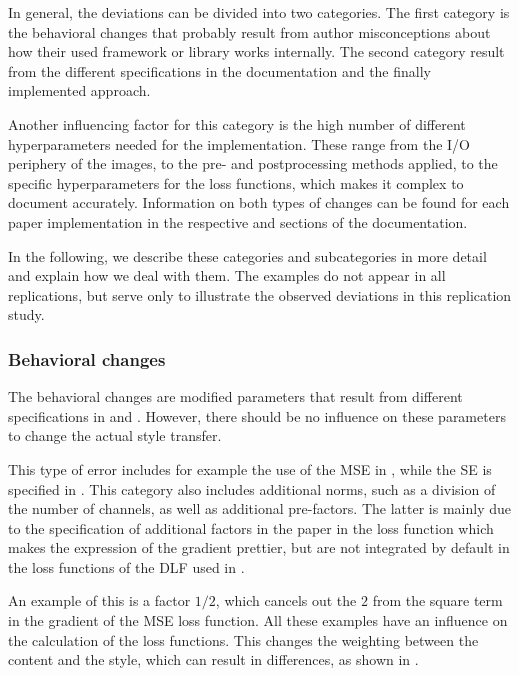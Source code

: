 In general, the deviations can be divided into two categories. The first category is the behavioral changes that probably result from author misconceptions about how their used framework or library works internally. The second category  result from the different specifications in the documentation and the finally implemented approach. 

Another influencing factor for this category is the high number of different hyperparameters needed for the implementation. These range from the I/O periphery of the images, to the pre- and postprocessing methods applied, to the specific hyperparameters for the loss functions, which makes it complex to document accurately. Information on both types of changes can be found for each paper implementation in the respective  and  sections of the documentation. 

In the following, we describe these categories and subcategories in more detail and explain how we deal with them. The examples do not appear in all replications, but serve only to illustrate the observed deviations in this replication study.

\subsubsection{Behavioral changes}
The behavioral changes are modified parameters that result from different specifications in \paper{} and \implementation{}. However, there should be no influence on these parameters to change the actual style transfer.  

This type of error includes for example the use of the \gls{MSE} in \implementation{}, while the \gls{SE} is specified in \paper{}. This category also includes additional norms, such as a division of the number of channels, as well as additional pre-factors. The latter is mainly due to the specification of additional factors in the paper in the loss function which makes the expression of the gradient prettier, but are not integrated by default in the loss functions of the \gls{DLF} used in \implementation{}. 

An example of this is a factor $1/2$, which cancels out the $2$ from the square term in the gradient of the \gls{MSE} loss function. All these examples have an influence on the calculation of the loss functions. This changes the weighting between the content and the style, which can result in differences, as shown in . 

